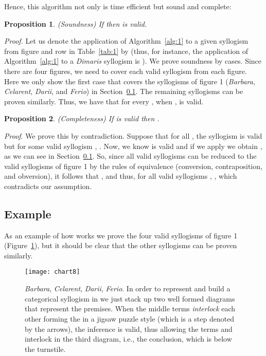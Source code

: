 \documentclass[a4paper,UKenglish]{lipics}
\newtheorem {mytheorem}{Proposition}
\begin{document}
Hence, this algorithm not only is time efficient but sound and complete:

\begin{mytheorem}
(Soundness) If  then  is valid.
\end{mytheorem}
\textit{Proof.} Let us denote the application of Algorithm~\ref{alg:1} to a given syllogism  from figure  and row  in Table~\ref{tab:1} by  (thus, for instance, the application of Algorithm~\ref{alg:1} to a \textit{Dimaris} syllogism is ). We prove soundness by cases. Since there are four figures, we need to cover each valid syllogism from each figure. Here we only show the first case that covers the syllogisms of figure 1 (\textit{Barbara}, \textit{Celarent}, \textit{Darii}, and \textit{Ferio}) in Section~\ref{subsec:example}. The remaining syllogisms can be proven similarly. Thus, we have that for every , when ,  is valid.  

\begin{mytheorem}
(Completeness) If  is valid then .
\end{mytheorem}
\textit{Proof}. We prove this by contradiction. Suppose that for all , the syllogism  is valid but for some valid syllogism ,  . Now, we know  is valid and if we apply  we obtain , as we can see in Section~\ref{subsec:example}. So, since all valid syllogisms  can be reduced to the valid syllogisms of figure 1 by the rules of equivalence (conversion, contraposition, and obversion), it follows that , and thus, for all valid syllogisms , , which contradicts our assumption. 

\subsection{Example}\label{subsec:example}
As an example of how  works we prove the four valid syllogisms of figure 1 (Figure~\ref{fig:10}), but it should be clear that the other syllogisms can be proven similarly. 

\begin{figure}[h]
  \texttt{[image: chart8]}
  \caption{\textit{Barbara}, \textit{Celarent}, \textit{Darii}, \textit{Ferio}. In order to represent and build a categorical syllogism in  we just stack up two well formed diagrams that represent the premises. When the middle terms \textit{interlock} each other forming the  in a jigsaw puzzle style (which is a step denoted by the arrows), the inference is valid, thus allowing the terms  and  interlock in the third diagram, i.e., the conclusion, which is below the turnstile.}
  \label{fig:10}
\end{figure}
\end{document}

